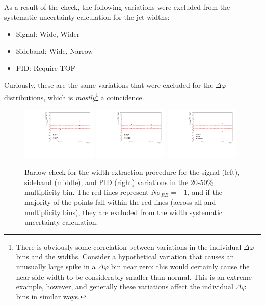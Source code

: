 As a result of the check, the following variations were excluded from the systematic uncertainty calculation for the jet widths:
%
\begin{itemize}
    \item Signal: Wide, Wider
    \item Sideband: Wide, Narrow
    \item PID: Require TOF
\end{itemize}
%
Curiously, these are the same variations that were excluded for the $\Delta\varphi$ distributions, which is \textit{mostly}\footnote{There is obviously some correlation between variations in the individual $\Delta\varphi$ bins and the widths. Consider a hypothetical variation that causes an unusually large spike in a $\Delta\varphi$ bin near zero: this would certainly cause the near-side width to be considerably smaller than normal. This is an extreme example, however, and generally these variations affect the individual $\Delta\varphi$ bins in similar ways.} a coincidence. 

\begin{figure}[ht]
    \centering
    \includegraphics[width=0.32\textwidth]{figures/analysis/width_signal_barlow_20_50.pdf}
    \includegraphics[width=0.32\textwidth]{figures/analysis/width_sideband_barlow_20_50.pdf}
    \includegraphics[width=0.32\textwidth]{figures/analysis/width_pid_barlow_20_50.pdf}
    \caption{Barlow check for the width extraction procedure for the signal (left), sideband (middle), and PID (right) variations in the 20-50\% multiplicity bin. The red lines represent $N\sigma_{RB} = \pm 1$, and if the majority of the points fall within the red lines (across all \pt and multiplicity bins), they are excluded from the width systematic uncertainty calculation.}
    \label{fig:barlow_check_width_20_50}
\end{figure}

